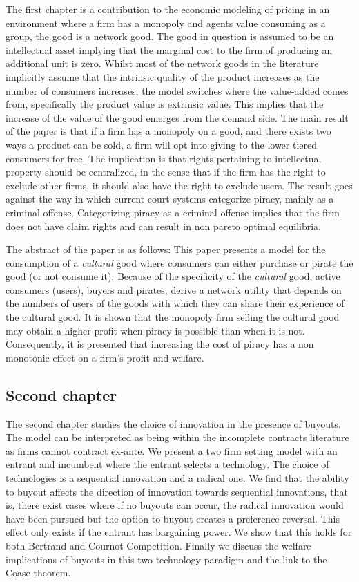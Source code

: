 The first chapter is a contribution to the economic modeling of pricing in an environment where a firm has a monopoly and agents value consuming as a group, the good is a network good. The good in question is assumed to be an intellectual asset implying that the marginal cost to the firm of producing an additional unit is zero. Whilst most of the network goods in the literature implicitly assume that the intrinsic quality of the product increases as the number of consumers increases, the model switches where the value-added comes from, specifically the product value is extrinsic value. This implies that the increase of the value of the good emerges from the demand side. The main result of the paper is that if a firm has a monopoly on a good, and there exists two ways a product can be sold, a firm will opt into giving to the lower tiered consumers for free. The implication is that rights pertaining to intellectual property should be centralized, in the sense that if the firm has the right to exclude other firms, it should also have the right to exclude users. The result goes against the way in which current court systems categorize piracy, mainly as a criminal offense. Categorizing piracy as a criminal offense implies that the firm does not have claim rights and can result in non pareto optimal equilibria. 

The abstract of the paper is as follows: This paper presents a model for the consumption of a \textit{cultural} good where consumers can either purchase or pirate the good (or not consume it). Because of the specificity of the \textit{cultural} good, active consumers (users), buyers and pirates, derive a network utility that depends on the numbers of users of the goods with which they can share their experience of the cultural good. It is shown that the monopoly firm selling the cultural good may obtain a higher profit when piracy is possible than when it is not. Consequently, it is presented that increasing the cost of piracy has a non monotonic effect on a firm's profit and welfare.

\subsection{Second chapter}

The second chapter studies the choice of innovation in the presence of buyouts. The model can be interpreted as being within the incomplete contracts literature as firms cannot contract ex-ante. We present a two firm setting model with an entrant and incumbent where the entrant selects a technology. The choice of technologies is a sequential innovation and a radical one. We find that the ability to buyout affects the direction of innovation towards sequential innovations, that is, there exist cases where if no buyouts can occur, the radical innovation would have been pursued but the option to buyout creates a preference reversal. This effect only exists if the entrant has bargaining power. We show that this holds for both Bertrand and Cournot Competition. Finally we discuss the welfare implications of buyouts in this two technology paradigm and the link to the Coase theorem. 

